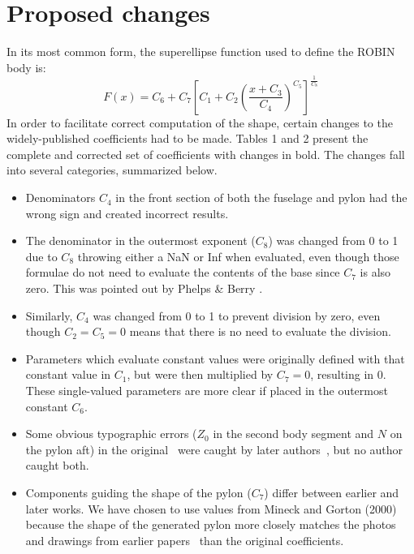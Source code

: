 \documentclass{ahs}
\begin{document}
\section{Proposed changes}
 In its most common form, the superellipse function used to define the ROBIN body is:
\begin{equation}
  F(x) = C_{6}+C_{7}\left[C_{1}+C_{2}\left(\frac{x+C_{3}}{C_{4}}\right)^{C_{5}}\right]^{\frac{1}{C_{8}}}
\end{equation}
In order to facilitate correct computation of the shape, certain changes to the
widely-published coefficients had to be made.
Tables 1 and 2 present the complete and corrected set of coefficients with changes in bold.
The changes fall into several categories, summarized below.
\begin{itemize}
\item Denominators $C_{4}$ in the front section of both the fuselage and pylon had the wrong sign
and created incorrect results.
\item The denominator in the outermost exponent ($C_{8}$) was changed from 0 to 1 due to $C_{8}$ throwing either a NaN or Inf when evaluated, even though those formulae do not need to evaluate the contents of the base since $C_{7}$ is also zero. This was pointed out by Phelps \& Berry \cite{nasa87762}.
\item Similarly, $C_{4}$ was changed from 0 to 1 to prevent division by zero, even though
$C_{2}=C_{5}=0$ means that there is no need to evaluate the division.
\item Parameters which evaluate constant values were originally defined with that constant value in $C_{1}$, but were then multiplied by $C_{7}=0$, resulting in $0$.
These single-valued parameters are more clear if placed in the outermost constant $C_{6}$.
\item Some obvious typographic errors ($Z_0$ in the second body segment and $N$ on the pylon aft)
in the original~ were caught by later authors~, but no author caught both.
\item Components guiding the shape of the pylon ($C_{7}$) differ between earlier and later works.
We have chosen to use values from Mineck and Gorton (2000)~ because the shape of the generated 
pylon more closely matches the photos and drawings from earlier papers~ than the original coefficients.
\end{itemize}
\end{document}
